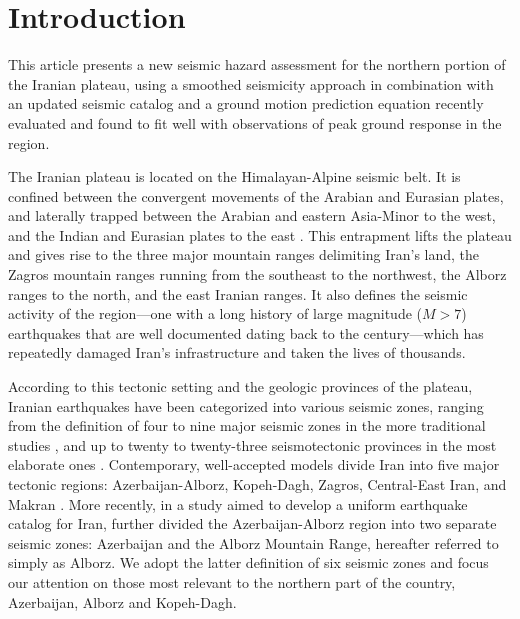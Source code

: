 
\section{Introduction}

This article presents a new seismic hazard assessment for the northern portion of the Iranian plateau, using a smoothed seismicity approach in combination with an updated seismic catalog and a ground motion prediction equation recently evaluated and found to fit well with observations of peak ground response in the region. 

The Iranian plateau is located on the Himalayan-Alpine seismic belt. It is confined between the convergent movements of the Arabian and Eurasian plates, and laterally trapped between the Arabian and eastern Asia-Minor to the west, and the Indian and Eurasian plates to the east \citep{Berberian_1981_Chap}. This entrapment lifts the plateau and gives rise to the three major mountain ranges delimiting Iran's land, the Zagros mountain ranges running from the southeast to the northwest, the Alborz ranges to the north, and the east Iranian ranges. It also defines the seismic activity of the region---one with a long history of large magnitude ($M>7$) earthquakes that are well documented dating back to the  century---which has repeatedly damaged Iran's infrastructure and taken the lives of thousands. 

According to this tectonic setting and the geologic provinces of the plateau, Iranian earthquakes have been categorized into various seismic zones, ranging from the definition of four to nine major seismic zones in the more traditional studies \citep[e.g.,][]{Stocklin1968, Takin1972, Berberian1976}, and up to twenty to twenty-three seismotectonic provinces in the most elaborate ones \citep[e.g.,][]{Nowroozi1976, Tavakoli1999}. Contemporary, well-accepted models divide Iran into five major tectonic regions: Azerbaijan-Alborz, Kopeh-Dagh, Zagros, Central-East Iran, and Makran \citep[e.g.,][]{Mirzaei1998}. More recently, in a study aimed to develop a uniform earthquake catalog for Iran, \citet{Karimiparidari2013} further divided the Azerbaijan-Alborz region into two separate seismic zones: Azerbaijan and the Alborz Mountain Range, hereafter referred to simply as Alborz. We adopt the latter definition of six seismic zones and focus our attention on those most relevant to the northern part of the country, Azerbaijan, Alborz and Kopeh-Dagh.

